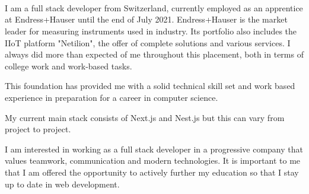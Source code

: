 \documentclass[9pt]{developercv} %
\begin{document}
\begin{minipage}[t]{0.23\textwidth} %
	\vspace{-\baselineskip} %
	
	\\
	\\
	\\
\end{minipage}

\vspace{0.5cm}



\begin{minipage}[t]{0.48\textwidth} %
	\vspace{-\baselineskip} %
  I am a full stack developer from Switzerland, currently employed as an apprentice at Endress+Hauser until the end of July 2021. Endress+Hauser is the market leader for measuring instruments used in industry. Its portfolio also includes the IIoT platform "Netilion", the offer of complete solutions and various services. I always did more than expected of me throughout this placement, both in terms of college work and work-based tasks.
\end{minipage}
\hfill %
\begin{minipage}[t]{0.48\textwidth} %
	\vspace{-\baselineskip} %
  This foundation has provided me with a solid technical skill set and work based experience in preparation for a career in computer science.

  My current main stack consists of Next.js and Nest.js but this can vary from project to project.
  
  I am interested in working as a full stack developer in a progressive company that values teamwork, communication and modern technologies. It is important to me that I am offered the opportunity to actively further my education so that I stay up to date in web development.
\end{minipage}
\end{document}
